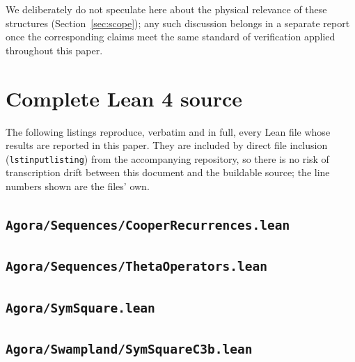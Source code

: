 \documentclass[11pt]{article}
\begin{document}
We deliberately do not speculate here about the physical relevance of these
structures (Section~\ref{sec:scope}); any such discussion belongs in a
separate report once the corresponding claims meet the same standard of
verification applied throughout this paper.




\appendix
\section{Complete Lean 4 source}
\label{app:source}

The following listings reproduce, verbatim and in full, every Lean file whose
results are reported in this paper. They are included by direct file
inclusion (\texttt{lstinputlisting}) from the accompanying repository, so
there is no risk of transcription drift between this document and the
buildable source; the line numbers shown are the files' own.

\subsection{\texttt{Agora/Sequences/CooperRecurrences.lean}}
\label{app:cooper-recurrences}


\subsection{\texttt{Agora/Sequences/ThetaOperators.lean}}
\label{app:theta-operators}


\subsection{\texttt{Agora/SymSquare.lean}}
\label{app:symsquare}


\subsection{\texttt{Agora/Swampland/SymSquareC3b.lean}}
\label{app:symsquarec3b}

\end{document}
